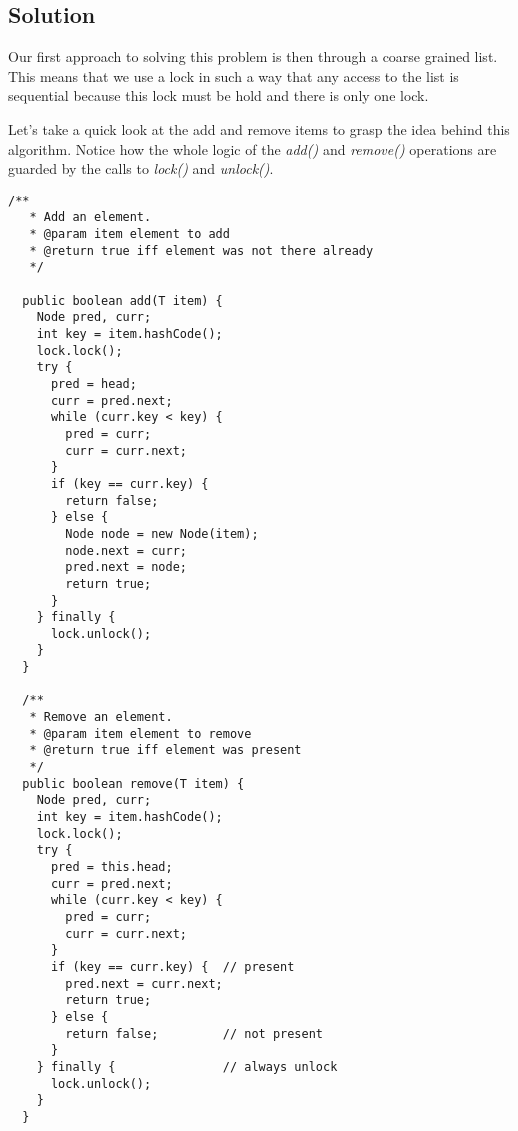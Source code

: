 \subsection{Solution}
\par
Our first approach to solving this problem is then through a coarse grained
list. This means that we use a lock in such a way that any access to the list is
sequential because this lock must be hold and there is only one lock.
\par
Let's take a quick look at the add and remove items to grasp the idea behind
this algorithm. Notice how the whole logic of the \textit{add()} and
\textit{remove()} operations are guarded by the calls to \textit{lock()} and
\textit{unlock()}.
\par
\hfil
\begin{lstlisting}[style=numbers]
  /** 
   * Add an element.
   * @param item element to add
   * @return true iff element was not there already
   */
  
  public boolean add(T item) {
    Node pred, curr;
    int key = item.hashCode();
    lock.lock();
    try {
      pred = head;
      curr = pred.next;
      while (curr.key < key) {
        pred = curr;
        curr = curr.next;
      }   
      if (key == curr.key) {
        return false;
      } else {
        Node node = new Node(item);
        node.next = curr;
        pred.next = node;
        return true;
      }   
    } finally {
      lock.unlock();
    }   
  }

  /** 
   * Remove an element.
   * @param item element to remove
   * @return true iff element was present
   */
  public boolean remove(T item) {
    Node pred, curr;
    int key = item.hashCode();
    lock.lock();
    try {
      pred = this.head;
      curr = pred.next;
      while (curr.key < key) {
        pred = curr;
        curr = curr.next;
      }   
      if (key == curr.key) {  // present
        pred.next = curr.next;
        return true;
      } else {
        return false;         // not present
      }   
    } finally {               // always unlock
      lock.unlock();
    }   
  }
\end{lstlisting}
\hfill
\par
